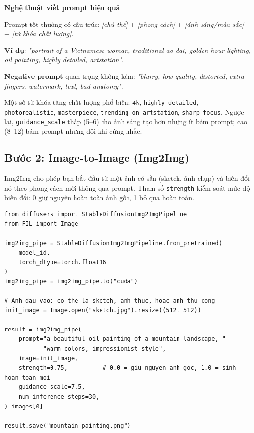 \begin{mdframed}[style=infobox]
\textbf{Nghệ thuật viết prompt hiệu quả}

Prompt tốt thường có cấu trúc: \textit{[chủ thể]} + \textit{[phong cách]} + \textit{[ánh sáng/màu sắc]} + \textit{[từ khóa chất lượng]}.

\textbf{Ví dụ:} \textit{"portrait of a Vietnamese woman, traditional ao dai, golden hour lighting, oil painting, highly detailed, artstation"}.

\textbf{Negative prompt} quan trọng không kém: \textit{"blurry, low quality, distorted, extra fingers, watermark, text, bad anatomy"}.

Một số từ khóa tăng chất lượng phổ biến: \texttt{4k}, \texttt{highly detailed}, \texttt{photorealistic}, \texttt{masterpiece}, \texttt{trending on artstation}, \texttt{sharp focus}. Ngược lại, \texttt{guidance\_scale} thấp (5--6) cho ảnh sáng tạo hơn nhưng ít bám prompt; cao (8--12) bám prompt nhưng đôi khi cứng nhắc.
\end{mdframed}

\subsection{Bước 2: Image-to-Image (Img2Img)}
\label{subsec:sd_img2img}

Img2Img cho phép bạn bắt đầu từ một ảnh có sẵn (sketch, ảnh chụp) và biến đổi nó theo phong cách mới thông qua prompt. Tham số \texttt{strength} kiểm soát mức độ biến đổi: 0 giữ nguyên hoàn toàn ảnh gốc, 1 bỏ qua hoàn toàn.

\begin{verbatim}
from diffusers import StableDiffusionImg2ImgPipeline
from PIL import Image

img2img_pipe = StableDiffusionImg2ImgPipeline.from_pretrained(
    model_id,
    torch_dtype=torch.float16
)
img2img_pipe = img2img_pipe.to("cuda")

# Anh dau vao: co the la sketch, anh thuc, hoac anh thu cong
init_image = Image.open("sketch.jpg").resize((512, 512))

result = img2img_pipe(
    prompt="a beautiful oil painting of a mountain landscape, "
           "warm colors, impressionist style",
    image=init_image,
    strength=0.75,          # 0.0 = giu nguyen anh goc, 1.0 = sinh hoan toan moi
    guidance_scale=7.5,
    num_inference_steps=30,
).images[0]

result.save("mountain_painting.png")
\end{verbatim}

